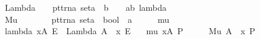 \begin{isabellebody}
\ \ {\isachardoublequoteopen}{\isacharasterisk}Lambda{\isachardoublequoteclose}\ \ \ {\isacharcolon}{\isacharcolon}\ {\isachardoublequoteopen}{\isacharbrackleft}pttrn{\isacharcomma}{\isacharprime}a\ set{\isacharcomma}{\isacharprime}a\ {\isacharequal}{\isachargreater}\ {\isacharprime}b{\isacharbrackright}\ \ \ {\isacharequal}{\isachargreater}\ {\isacharprime}a{\isacharless}{\isacharequal}{\isachargreater}{\isacharprime}b{\isachardoublequoteclose}\ {\isacharparenleft}{\isachardoublequoteopen}{\isacharparenleft}{}lambda\ {\isacharparenleft}{\isacharunderscore}{\isacharparenright}{\isacharcolon}{\isacharparenleft}{\isacharunderscore}{\isacharparenright}{\isachardot}{\isacharslash}\ {\isacharunderscore}{\isacharparenright}{\isachardoublequoteclose}\ {\isacharbrackleft}{}{\isacharcomma}{}{\isacharcomma}{}{}{\isacharbrackright}{}{}{\isacharparenright}\isanewline
\ \ {\isachardoublequoteopen}{\isacharasterisk}Mu{\isachardoublequoteclose}\ \ \ \ \ \ \ {\isacharcolon}{\isacharcolon}\ {\isachardoublequoteopen}{\isacharbrackleft}pttrn{\isacharcomma}{\isacharprime}a\ set{\isacharcomma}{\isacharprime}a\ {\isacharequal}{\isachargreater}\ bool{\isacharbrackright}\ {\isacharequal}{\isachargreater}\ {\isacharprime}a{\isachardoublequoteclose}\ \ \ \ \ \ {\isacharparenleft}{\isachardoublequoteopen}{\isacharparenleft}{}mu\ {\isacharparenleft}{\isacharunderscore}{\isacharparenright}{\isacharcolon}{\isacharparenleft}{\isacharunderscore}{\isacharparenright}{\isachardot}{\isacharslash}\ {\isacharunderscore}{\isacharparenright}{\isachardoublequoteclose}\ \ \ \ \ {\isacharbrackleft}{}{\isacharcomma}{}{\isacharcomma}{}{}{\isacharbrackright}{}{}{\isacharparenright}\isanewline
\isanewline
\isanewline
{}\isamarkupfalse%
\isanewline
\ \ {\isachardoublequoteopen}lambda\ x{\isacharcolon}A{\isachardot}\ E{\isachardoublequoteclose}\ {\isacharequal}{\isacharequal}\ {\isachardoublequoteopen}Lambda\ A\ {\isacharparenleft}{\isacharpercent}\ x{\isachardot}\ E{\isacharparenright}{\isachardoublequoteclose}\ \isanewline
\ \ {\isachardoublequoteopen}mu\ x{\isacharcolon}A{\isachardot}\ P{\isachardoublequoteclose}\ \ \ \ \ {\isacharequal}{\isacharequal}\ {\isachardoublequoteopen}Mu\ A\ {\isacharparenleft}{\isacharpercent}\ x{\isachardot}\ P{\isacharparenright}{\isachardoublequoteclose}\isanewline
\ \ \isanewline
\isanewline
\isanewline
\isanewline
\isanewline
\isanewline
\isanewline
\isanewline
{}\isamarkupfalse%

\end{isabellebody}
